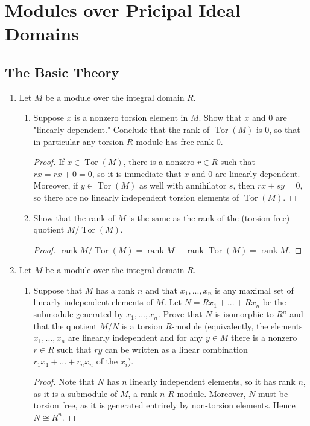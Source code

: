 \documentclass{report}
\DeclareMathOperator{\Tor}{Tor}
\DeclareMathOperator{\rk}{rank}
\begin{document}
\chapter{Modules over Pricipal Ideal Domains}
\section{The Basic Theory}
\begin{enumerate} 
	\item Let $M$ be a module over the integral domain $R$.
		\begin{enumerate} [label=(\alph*)]
			\item Suppose $x$ is a nonzero torsion element in $M$. Show that $x$ and $0$ are "linearly dependent."
				Conclude that the rank of $\Tor(M)$ is $0$, so that in particular any torsion $R$-module has free rank $0$.
				\begin{proof}
					If $x\in\Tor(M)$, there is a nonzero $r\in R$ such that $rx=rx+0=0$, so it is immediate that $x$ and $0$ are linearly dependent.
					Moreover, if $y\in\Tor(M)$ as well with annihilator $s$, then $rx+sy=0$, so there are no linearly independent torsion elements of $\Tor(M)$.
				\end{proof}
			\item Show that the rank of $M$ is the same as the rank of the (torsion free) quotient $M / \Tor(M)$.
				\begin{proof}
					$\rk M / \Tor(M)=\rk M - \rk \Tor(M)= \rk M$.	
				\end{proof}
		\end{enumerate}
	\item Let $M$ be a module over the integral domain $R$.
		\begin{enumerate} [label=(\alph*)]
			\item Suppose that $M$ has a rank $n$ and that $x_1,...,x_n$ is any maximal set of linearly independent elements of $M$.
				Let $N=Rx_1+...+Rx_n$ be the submodule generated by $x_1,...,x_n$. Prove that $N$ is isomorphic to $R^n$ and that the quotient $M / N$
				is a torsion $R$-module (equivalently, the elements $x_1,...,x_n$ are linearly independent and for any $y\in M$ there is a nonzero $r\in R$ such that
				$ry$ can be written as a linear combination $r_1x_1+...+r_nx_n$ of the $x_i$).
				\begin{proof}
					Note that $N$ has $n$ linearly independent elements, so it has rank $n$, as it is a submodule of $M$, a rank $n$ $R$-module.
					Moreover, $N$ must be torsion free, as it is generated entrirely by non-torsion elements. Hence $N\cong R^n$.

\end{proof}
\end{enumerate}
\end{enumerate}
\end{document}
